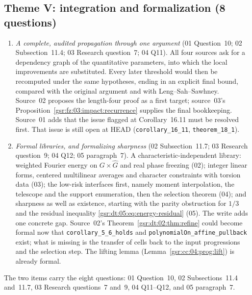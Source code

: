 \documentclass[11pt,letterpaper]{article}
\numberwithin{equation}{section}
\theoremstyle{definition}
\theoremstyle{remark}
\newcommand{\1}{\mathbf 1}
\newcommand{\file}[1]{\nolinkurl{#1}}
\begin{document}
\subsection*{Theme V: integration and formalization (8 questions)}
\begin{enumerate}[label=\textbf{V.\arabic*},ref=V.\arabic*,leftmargin=2.6em]
\item\label{gsr:fz:q:V:ledger} \emph{A complete, audited propagation through one argument} (01 Question~10; 02 Subsection~11.4; 03 Research question~7; 04 Q11). All four sources ask for a dependency graph of the quantitative parameters, into which the local improvements are substituted. Every later threshold would then be recomputed under the same hypotheses, ending in an explicit final bound, compared with the original argument and with Leng--Sah--Sawhney. Source~02 proposes the length-four proof as a first target; source~03's Proposition~\ref{gsr:fz:03:impact:recurrence} supplies the final bookkeeping. Source~01 adds that the issue flagged at Corollary~16.11 must be resolved first. That issue is still open at HEAD (\file{corollary_16_11}, \file{theorem_18_1}).
\item\label{gsr:fz:q:V:library} \emph{Formal libraries, and formalizing sharpness} (02 Subsection~11.7; 03 Research question~9; 04 Q12; 05 paragraph~7). A characteristic-independent library: weighted Fourier energy on $G\times\widehat G$ and real phase freezing (02); integer linear forms, centered multilinear averages and character constraints with torsion data (03); the low-risk interfaces first, namely moment interpolation, the telescope and the support enumeration, then the selection theorem (04); and sharpness as well as existence, starting with the parity obstruction for $1/3$ and the residual inequality \eqref{gsr:dt:05:eq:energy-residual} (05). The write adds one concrete gap. Source~02's Theorem~\ref{gsr:dt:02:thm:refine} could become formal now that \file{corollary_5_6_holds} and \file{polynomialOn_affine_pullback} exist; what is missing is the transfer of cells back to the input progressions and the selection step. The lifting lemma (Lemma~\ref{gsr:cc:04:prog:lift}) is already formal.
\end{enumerate}
The two items carry the eight questions: 01 Question~10, 02 Subsections~11.4 and~11.7, 03 Research questions~7 and~9, 04 Q11--Q12, and 05 paragraph~7.
\end{document}
